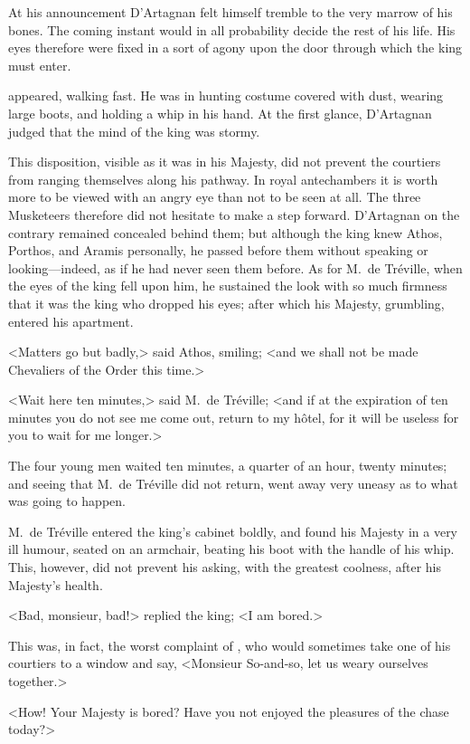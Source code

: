 At his announcement D'Artagnan felt himself tremble to the very marrow of his bones. The coming instant would in all probability decide the rest of his life. His eyes therefore were fixed in a sort of agony upon the door through which the king must enter. 

 appeared, walking fast. He was in hunting costume covered with dust, wearing large boots, and holding a whip in his hand. At the first glance, D'Artagnan judged that the mind of the king was stormy. 

This disposition, visible as it was in his Majesty, did not prevent the courtiers from ranging themselves along his pathway. In royal antechambers it is worth more to be viewed with an angry eye than not to be seen at all. The three Musketeers therefore did not hesitate to make a step forward. D'Artagnan on the contrary remained concealed behind them; but although the king knew Athos, Porthos, and Aramis personally, he passed before them without speaking or looking—indeed, as if he had never seen them before. As for M.~de Tréville, when the eyes of the king fell upon him, he sustained the look with so much firmness that it was the king who dropped his eyes; after which his Majesty, grumbling, entered his apartment. 

<Matters go but badly,> said Athos, smiling; <and we shall not be made Chevaliers of the Order this time.> 

<Wait here ten minutes,> said M.~de Tréville; <and if at the expiration of ten minutes you do not see me come out, return to my hôtel, for it will be useless for you to wait for me longer.> 

The four young men waited ten minutes, a quarter of an hour, twenty minutes; and seeing that M.~de Tréville did not return, went away very uneasy as to what was going to happen. 

M.~de Tréville entered the king's cabinet boldly, and found his Majesty in a very ill humour, seated on an armchair, beating his boot with the handle of his whip. This, however, did not prevent his asking, with the greatest coolness, after his Majesty's health. 

<Bad, monsieur, bad!> replied the king; <I am bored.> 

This was, in fact, the worst complaint of , who would sometimes take one of his courtiers to a window and say, <Monsieur So-and-so, let us weary ourselves together.> 

<How! Your Majesty is bored? Have you not enjoyed the pleasures of the chase today?> 

